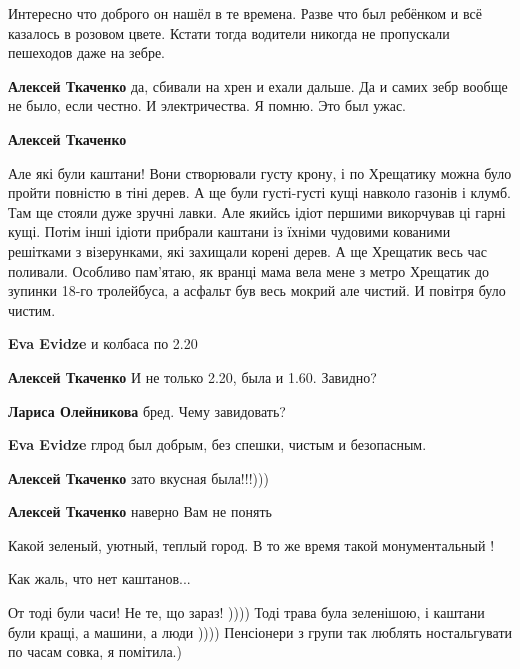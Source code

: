 \begin{itemize}

Интересно что доброго он нашёл в те времена. Разве что был ребёнком и всё
казалось в розовом цвете. Кстати тогда водители никогда не пропускали пешеходов
даже на зебре.

\begin{itemize} %
\textbf{Алексей Ткаченко} да, сбивали на хрен и ехали дальше. Да и самих зебр вообще не было, если честно. И электричества. Я помню. Это был ужас.

\textbf{Алексей Ткаченко} 

Але які були каштани! Вони створювали густу крону, і по Хрещатику можна було
пройти повністю в тіні дерев. А ще були густі-густі кущі навколо газонів і
клумб. Там ще стояли дуже зручні лавки. Але якийсь ідіот першими викорчував ці
гарні кущі. Потім інші ідіоти прибрали каштани із їхніми чудовими кованими
решітками з візерунками, які захищали корені дерев. А ще Хрещатик весь час
поливали. Особливо пам'ятаю, як вранці мама вела мене з метро Хрещатик до
зупинки 18-го тролейбуса, а асфальт був весь мокрий але чистий. И повітря було
чистим.

\begin{itemize} %
\textbf{Eva Evidze} и колбаса по 2.20

\textbf{Алексей Ткаченко} И не только 2.20, была и 1.60. Завидно?

\textbf{Лариса Олейникова} бред. Чему завидовать?

\textbf{Eva Evidze} глрод был добрым, без спешки, чистым и безопасным.

\textbf{Алексей Ткаченко} зато вкусная была!!!)))
\end{itemize} %

\textbf{Алексей Ткаченко} наверно Вам не понять

\end{itemize} %

Какой зеленый, уютный, теплый город. В то же время такой монументальный !

Как жаль, что нет каштанов...


От тоді були часи! Не те, що зараз! )))) Тоді трава була зеленішою, і каштани
були кращі, а машини, а люди )))) Пенсіонери з групи так люблять ностальгувати
по часам совка, я помітила.)


\end{itemize}
